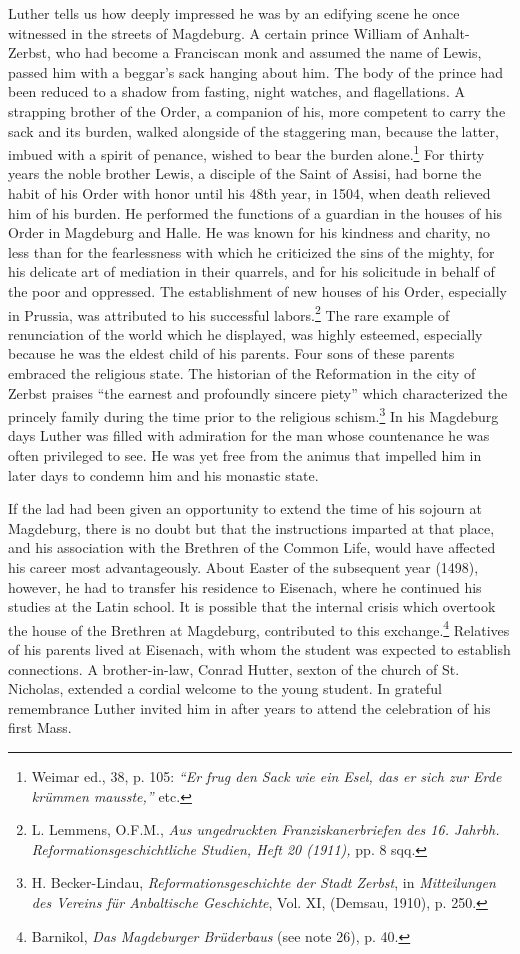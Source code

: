 Luther tells us how deeply impressed he was by an edifying scene
he once witnessed in the streets of Magdeburg. A certain prince
William of Anhalt-Zerbst, who had become a Franciscan monk and
assumed the name of Lewis, passed him with a beggar's sack hanging
about him. The body of the prince had been reduced to a shadow
from fasting, night watches, and flagellations. A strapping brother
of the Order, a companion of his, more competent to carry the sack
and its burden, walked alongside of the staggering man, because the
latter, imbued with a spirit of penance, wished to bear the burden
alone.\footnote{Weimar ed., 38, p. 105: \textit{“Er frug den Sack wie ein Esel, das er sich zur Erde krümmen mausste,”} etc.}
For thirty years the noble brother Lewis, a disciple of the
Saint of Assisi, had borne the habit of his Order with honor until his
48th year, in 1504, when death relieved him of his burden. He performed
the functions of a guardian in the houses of his Order in
Magdeburg and Halle. He was known for his kindness and charity,
no less than for the fearlessness with which he criticized the sins of
the mighty, for his delicate art of mediation in their quarrels, and for
his solicitude in behalf of the poor and oppressed. The establishment
of new houses of his Order, especially in Prussia, was attributed to
his successful labors.\footnote{L. Lemmens, O.F.M., \textit{Aus ungedruckten Franziskanerbriefen des 16. Jahrbh. Reformationsgeschichtliche Studien, Heft 20 (1911),} pp. 8 sqq.}
The rare example of renunciation of the world
which he displayed, was highly esteemed, especially because he was the
eldest child of his parents. Four sons of these parents embraced the religious state.
The historian of the Reformation in the city of Zerbst
praises “the earnest and profoundly sincere piety” which characterized the princely family during the time prior to the religious schism.\footnote{H. Becker-Lindau, \textit{Reformationsgeschichte der Stadt Zerbst}, in \textit{Mitteilungen des Vereins für Anbaltische Geschichte}, Vol. XI, (Demsau, 1910), p. 250.}
In his Magdeburg days Luther was filled with admiration for the man
whose countenance he was often privileged to see. He was yet free
from the animus that impelled him in later days to condemn him and
his monastic state.

If the lad had been given an opportunity to extend the time of his
sojourn at Magdeburg, there is no doubt but that the instructions
imparted at that place, and his association with the Brethren of the
Common Life, would have affected his career most advantageously.
About Easter of the subsequent year (1498), however, he had to
transfer his residence to Eisenach, where he continued his studies at
the Latin school. It is possible that the internal crisis which overtook
the house of the Brethren at Magdeburg, contributed to this exchange.\footnote{Barnikol, \textit{Das Magdeburger Brüderbaus} (see note 26), p. 40.}
Relatives of his parents lived at Eisenach, with whom the
student was expected to establish connections.
A brother-in-law, Conrad Hutter, sexton of the church of St. Nicholas, extended a cordial
welcome to the young student. In grateful remembrance Luther invited him in after years to attend the celebration of his first Mass.

